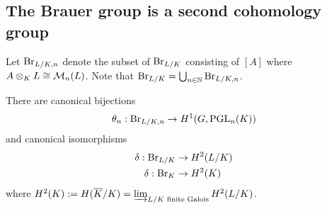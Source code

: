 \subsection{The Brauer group is a second cohomology group}
\begin{df}
Let $\operatorname{Br}_{L/K,n}$ denote the subset of $\operatorname{Br}_{L/K}$ consisting of $[A]$ where $A\otimes_K L\cong \mathcal{M}_n(L)$. Note that $\operatorname{Br}_{L/K}=\bigcup_{n\in \mathbb{N}}\operatorname{Br}_{L/K,n}$.
\end{df}
\begin{thm}
There are canonical bijections
\[
\theta_n:\operatorname{Br}_{L/K,n}\to H^1(G,\operatorname{PGL}_n(K))
\]
and canonical isomorphisms
\begin{align*}
\delta:\operatorname{Br}_{L/K}&\to H^2(L/K)\\
\delta:\operatorname{Br}_{K}&\to H^2(K)
\end{align*}
where $H^2(K):=H(\overline{K}/K)=\varinjlim_{L/K\text{ finite Galois}} H^2(L/K)$.
\end{thm}
